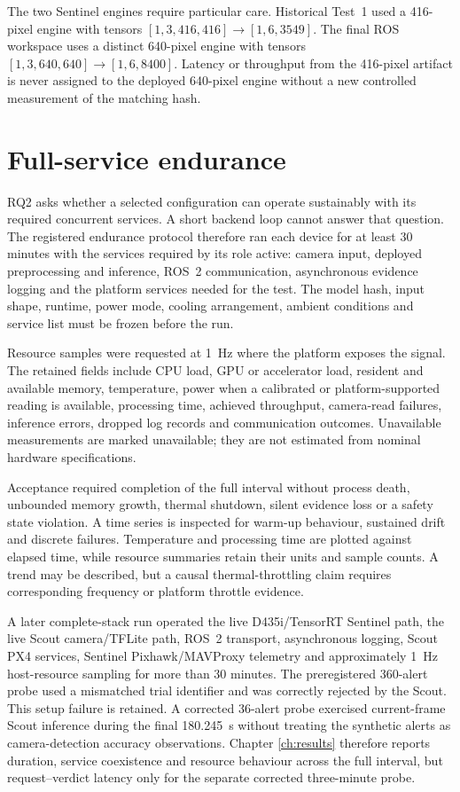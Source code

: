 The two Sentinel engines require particular care. Historical Test~1 used a
416-pixel engine with tensors \( [1,3,416,416] \rightarrow [1,6,3549] \).
The final ROS workspace uses a distinct 640-pixel engine with tensors
\( [1,3,640,640] \rightarrow [1,6,8400] \). Latency or throughput from the
416-pixel artifact is never assigned to the deployed 640-pixel engine without
a new controlled measurement of the matching hash.

\section{Full-service endurance}
\label{sec:methodology:4}

RQ2 asks whether a selected configuration can operate sustainably with its
required concurrent services. A short backend loop cannot answer that
question. The registered endurance protocol therefore ran each device for at
least 30 minutes with the services required by its role active: camera input, deployed
preprocessing and inference, ROS~2 communication, asynchronous evidence
logging and the platform services needed for the test. The model hash, input
shape, runtime, power mode, cooling arrangement, ambient conditions and service
list must be frozen before the run.

Resource samples were requested at 1~Hz where the platform exposes the signal.
The retained fields include CPU load, GPU or accelerator load, resident and
available memory, temperature, power when a calibrated or platform-supported
reading is available, processing time, achieved throughput, camera-read
failures, inference errors, dropped log records and communication outcomes.
Unavailable measurements are marked unavailable; they are not estimated from
nominal hardware specifications.

Acceptance required completion of the full interval without process death,
unbounded memory growth, thermal shutdown, silent evidence loss or a safety
state violation. A time series is inspected for warm-up behaviour, sustained
drift and discrete failures. Temperature and processing time are plotted
against elapsed time, while resource summaries retain their units and sample
counts. A trend may be described, but a causal thermal-throttling claim requires
corresponding frequency or platform throttle evidence.

A later complete-stack run operated the live D435i/TensorRT Sentinel path, the
live Scout camera/TFLite path, ROS~2 transport, asynchronous logging, Scout PX4
services, Sentinel Pixhawk/MAVProxy telemetry and approximately 1~Hz
host-resource sampling for more than 30 minutes. The preregistered 360-alert
probe used a mismatched trial identifier and was correctly rejected by the
Scout. This setup failure is retained. A corrected 36-alert probe exercised
current-frame Scout inference during the final 180.245~s without treating the
synthetic alerts as camera-detection accuracy observations. Chapter
\ref{ch:results} therefore reports duration, service coexistence and resource
behaviour across the full interval, but request--verdict latency only for the
separate corrected three-minute probe.

